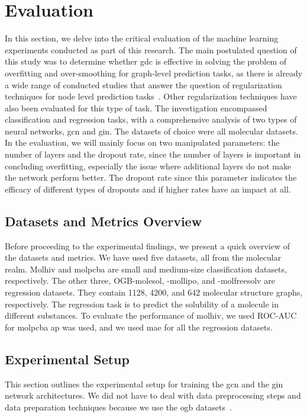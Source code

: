 %
\chapter{Evaluation}
\label{sec:eval}
In this section, we delve into the critical evaluation of the machine learning experiments conducted as part of this research.
The main postulated question of this study was to determine whether \ac{gdc} is effective in solving the problem of overfitting and over-smoothing for graph-level prediction tasks, as there is already a wide range of conducted studies that answer the question of regularization techniques for node level prediction tasks~\cite{Hasanzadeh2020,Rong2020,Srivastava2014,Chen2018}.
Other regularization techniques have also been evaluated for this type of task.
The investigation encompassed classification and regression tasks, with a comprehensive analysis of two types of neural networks, \ac{gcn} and \ac{gin}.
The datasets of choice were all molecular datasets.
In the evaluation, we will mainly focus on two manipulated parameters: the number of layers and the dropout rate, since the number of layers is important in concluding overfitting, especially the issue where additional layers do not make the network perform better.
The dropout rate since this parameter indicates the efficacy of different types of dropouts and if higher rates have an impact at all.

\section{Datasets and Metrics Overview}
\label{sec:eval:overvies}

Before proceeding to the experimental findings, we present a quick overview of the datasets and metrics.
We have used five datasets, all from the molecular realm.
Molhiv and molpcba are small and medium-size classification datasets, respectively.
The other three, OGB-molesol, -mollipo, and -molfreesolv are regression datasets.
They contain 1128, 4200, and 642 molecular structure graphs, respectively.
The regression task is to predict the solubility of a molecule in different substances.
To evaluate the performance of molhiv, we used ROC-AUC for molpcba \ac{ap} was used, and we used \ac{mae} for all the regression datasets.

\section{Experimental Setup}
\label{sec:eval:setup}
This section outlines the experimental setup for training the \ac{gcn} and the \ac{gin} network architectures.
We did not have to deal with data preprocessing steps and data preparation techniques because we use the \ac{ogb} datasets~\cite{Hu2020}.

